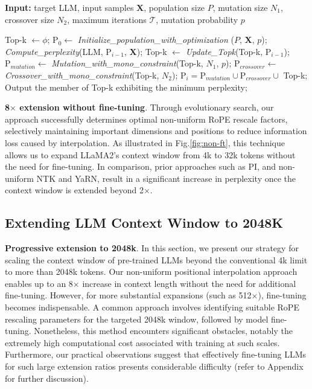 \begin{algorithm}[t]
	\small
	\caption{The search algorithm}
	\textbf{Input:} target LLM, input samples $\mathbf{X}$, population size $P$, mutation size $N_1$, crossover size $N_2$, maximum iterations $\mathcal{T}$, mutation probability $p$ \\

	\begin{algorithmic}[1]
		\label{alg:search}
		\STATE Top-k $\gets \phi$;
		\STATE $\text{P}_0 \gets$ \textit{Initialize\_population\_with\_optimization} ($P$, $\mathbf{X}$, $p$);
		\STATE \textit{Compute\_perplexity}(LLM, $\text{P}_{i-1}$, $\mathbf{X}$);
		\STATE Top-k $\gets$ \textit{Update\_Topk}(Top-k, $\text{P}_{i-1}$);
		\STATE $\text{P}_{mutation} \gets$ \textit{Mutation\_with\_mono\_constraint}(Top-k, $N_1$, $p$);
		\STATE $\text{P}_{crossover} \gets$ \textit{Crossover\_with\_mono\_constraint}(Top-k, $N_2$);
		\STATE $\text{P}_i = \text{P}_{mutation} \cup \text{P}_{crossover} \cup$ Top-k;
		\ENDFOR
		\STATE Output the member of Top-k exhibiting the minimum perplexity;
	\end{algorithmic}
\end{algorithm}

\textbf{8$\times$ extension without fine-tuning}. Through evolutionary search, our approach successfully determines optimal non-uniform RoPE rescale factors, selectively maintaining important dimensions and positions to reduce information loss caused by interpolation. As illustrated in Fig.\ref{fig:non-ft}, this technique allows us to expand LLaMA2's context window from 4k to 32k tokens without the need for fine-tuning. In comparison, prior approaches such as PI, and non-uniform NTK and YaRN, result in a significant increase in perplexity once the context window is extended beyond 2$\times$.

\subsection{Extending LLM Context Window to 2048K}
\label{sec:extendto2048k}

\textbf{Progressive extension to 2048k}. In this section, we present our strategy for scaling the context window of pre-trained LLMs beyond the conventional 4k limit to more than 2048k tokens. Our non-uniform positional interpolation approach enables up to an 8$\times$ increase in context length without the need for additional fine-tuning. However, for more substantial expansions (such as 512$\times$), fine-tuning becomes indispensable. A common approach involves identifying suitable RoPE rescaling parameters for the targeted 2048k window, followed by model fine-tuning. Nonetheless, this method encounters significant obstacles, notably the extremely high computational cost associated with training at such scales. Furthermore, our practical observations suggest that effectively fine-tuning LLMs for such large extension ratios presents considerable difficulty (refer to Appendix for further discussion).

